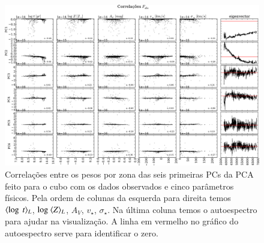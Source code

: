 \begin{figure}
    \includegraphics[width=1.2\textwidth, angle=-90]{figuras/K0277-correl-f_obs-PCvsPhys.pdf}
	\caption[Correlações PCs vs. par\^ametros f\'isicos - $F_{obs}$.]
    {Correlações entre os pesos por zona das seis primeiras PCs da PCA feito para o cubo com os dados observados e cinco
    parâmetros físicos. Pela ordem de colunas da esquerda para direita temos $\meanL{\log\ t}$, $\log\ \meanL{Z}$,
    $A_V$, $v_{\star}$, $\sigma_{\star}$. Na última coluna temos o autoespectro para ajudar na visualização. A linha em
    vermelho no gráfico do autoespectro serve para identificar o zero.}
    \label{fig:K0277correfobs}
\end{figure}

